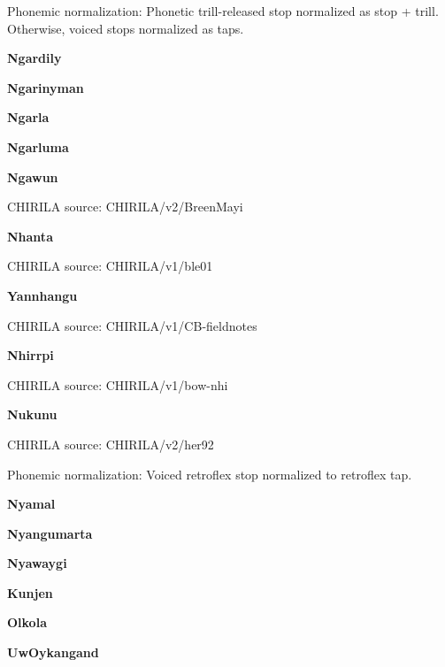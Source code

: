 Phonemic normalization: Phonetic trill-released stop normalized as stop
+ trill. Otherwise, voiced stops normalized as taps.

\textbf{Ngardily}


\textbf{Ngarinyman}


\textbf{Ngarla}


\textbf{Ngarluma}


\textbf{Ngawun}

CHIRILA source: CHIRILA/v2/BreenMayi


\textbf{Nhanta}

CHIRILA source: CHIRILA/v1/ble01


\textbf{Yannhangu}

CHIRILA source: CHIRILA/v1/CB-fieldnotes


\textbf{Nhirrpi}

CHIRILA source: CHIRILA/v1/bow-nhi


\textbf{Nukunu}

CHIRILA source: CHIRILA/v2/her92


Phonemic normalization: Voiced retroflex stop normalized to retroflex
tap.

\textbf{Nyamal}


\textbf{Nyangumarta}


\textbf{Nyawaygi}


\textbf{Kunjen}


\textbf{Olkola}


\textbf{UwOykangand}


